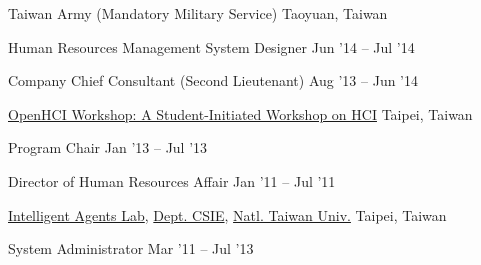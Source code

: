 \documentclass[10pt, a4paper]{article} %
\begin{document}

\headedsection
{Taiwan Army (Mandatory Military Service)}
{Taoyuan, Taiwan}{

	\headedsubsection
	{Human Resources Management System Designer}
	{Jun '14 -- Jul '14}
	{}

	\headedsubsection
	{Company Chief Consultant (Second Lieutenant)}
	{Aug '13 -- Jun '14}
	{}

}

\headedsection
{\href{http://www.openhci.com/}{OpenHCI Workshop: A Student-Initiated Workshop on HCI}}
{Taipei, Taiwan}{

	\headedsubsection
	{Program Chair}
	{Jan '13 -- Jul '13}
	{}

	\headedsubsection
	{Director of Human Resources Affair}
	{Jan '11 -- Jul '11}
	{}

}


\headedsection
{\href{http://agent.csie.ntu.edu.tw/}{Intelligent Agents Lab}, 
 \href{http://www.csie.ntu.edu.tw}{Dept. CSIE},
 \href{http://www.ntu.edu.tw}{Natl. Taiwan Univ.}}
{Taipei, Taiwan}{

	\headedsubsection
	{System Administrator}
	{Mar '11 -- Jul '13}
	{}

}


\spacedhrule{1.5em}{-1em} %
\end{document}

